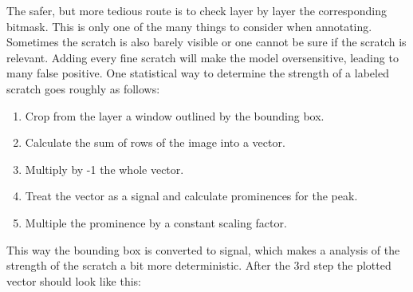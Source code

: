 The safer, but more tedious route is to check layer by layer the corresponding bitmask. This is only one of the many things to consider when annotating.\\

Sometimes the scratch is also barely visible or one cannot be sure if the scratch is relevant. Adding every fine scratch will make the model oversensitive, leading to many false positive. One statistical way to determine the strength of a labeled scratch goes roughly as follows:
\begin{enumerate}
\item Crop from the layer a window outlined by the bounding box.
\item Calculate the sum of rows of the image into a vector.
\item Multiply by -1 the whole vector.
\item Treat the vector as a signal and calculate prominences for the peak.
\item Multiple the prominence by a constant scaling factor.
\end{enumerate}

This way the bounding box is converted to signal, which makes a analysis of the strength of the scratch a bit more deterministic. After the 3rd step the plotted vector should look like this:

